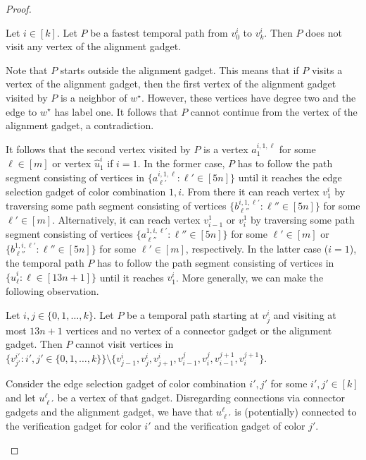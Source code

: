 \documentclass[a4paper,UKenglish,cleveref, autoref, thm-restate, anonymous]{lipics-v2021}
\begin{document}
\begin{proof}
\begin{claim}\label{claim:11}
Let $i\in[k]$. Let $P$ be a fastest temporal path from $v_0^i$ to $v_k^i$. Then $P$ does not visit any vertex of the alignment gadget.
\end{claim}
\begin{claimproof}
    Note that $P$ starts outside the alignment gadget. This means that if $P$ visits a vertex of the alignment gadget, then the first vertex of the alignment gadget visited by $P$ is a neighbor of $w^\star$. However, these vertices have degree two and the edge to $w^\star$ has label one. It follows that $P$ cannot continue from the vertex of the alignment gadget, a contradiction.
\end{claimproof}

It follows that the second vertex visited by $P$ is a vertex $a^{i,1,\ell}_{1}$ for some $\ell\in[m]$ or vertex $\hat{u}_1^i$ if $i=1$. In the former case, $P$ has to follow the path segment consisting of vertices in $\{a^{i,1,\ell}_{\ell'} :  \ell'\in[5n]\}$ until it reaches the edge selection gadget of color combination $1,i$. From there it can reach vertex $v_1^i$ by traversing some path segment consisting of vertices $\{b^{i,1,\ell'}_{\ell''} :  \ell''\in[5n]\}$ for some $\ell'\in[m]$. Alternatively, it can reach vertex $v^1_{i-1}$ or $v^1_{i}$ by traversing some path segment consisting of vertices $\{a^{1,i,\ell'}_{\ell''} :  \ell''\in[5n]\}$ for some $\ell'\in[m]$ or $\{b^{1,i,\ell'}_{\ell''} :  \ell''\in[5n]\}$ for some $\ell'\in[m]$, respectively. In the latter case ($i=1$), the temporal path $P$ has to follow the path segment consisting of vertices in $\{\hat{u}^i_\ell :  \ell\in[13n+1]\}$ until it reaches $v^i_1$. More generally, we can make the following observation.
\begin{claim}\label{claim:12}
    Let $i,j\in\{0,1,\ldots,k\}$. Let $P$ be a temporal path starting at $v^i_j$ and visiting at most $13n+1$ vertices and no vertex of a connector gadget or the alignment gadget. Then $P$ cannot visit vertices in $\{v^{i'}_{j'} :  i',j'\in \{0,1,\ldots,k\}\}\setminus\{v^i_{j-1},v^i_j,v^i_{j+1},v^j_{i-1},v^j_i,v^{j+1}_{i-1},v^{j+1}_i\}$.
\end{claim}
\begin{claimproof}
    Consider the edge selection gadget of color combination $i',j'$ for some $i',j'\in[k]$ and let $u^\ell_{\ell'}$ be a vertex of that gadget. Disregarding connections via connector gadgets and the alignment gadget, we have that $u^\ell_{\ell'}$ is (potentially) connected to the verification gadget for color $i'$ and the verification gadget of color $j'$.

\end{claimproof}
\end{proof}
\end{document}

